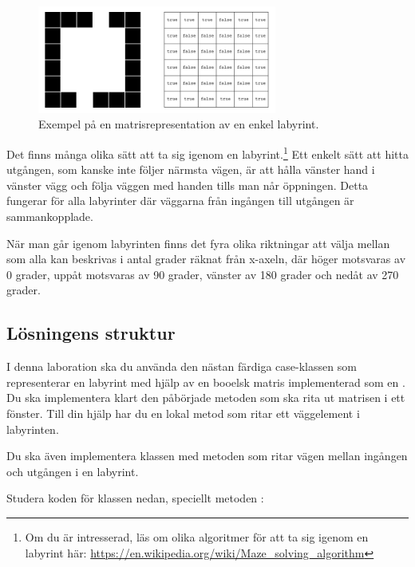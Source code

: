 \begin{figure}[h]
	\begin{center}
		\includegraphics[width=0.7\textwidth]{../img/w09-lab/MazeAndMatrix.jpg}
	\end{center}
	\caption{Exempel på en matrisrepresentation av en enkel labyrint.}
	\label{maze:figboolmatrix}
\end{figure}

Det finns många olika sätt att ta sig igenom en labyrint.\footnote{Om du är intresserad, läs om olika algoritmer för att ta sig igenom en labyrint här: \url{https://en.wikipedia.org/wiki/Maze\_solving\_algorithm}} Ett enkelt sätt att hitta utgången, som kanske inte följer närmsta vägen, är att hålla vänster hand i vänster vägg och följa väggen med handen tills man når öppningen. Detta fungerar för alla labyrinter där väggarna från ingången till utgången är sammankopplade.

När man går igenom labyrinten finns det fyra olika riktningar att välja mellan som alla kan beskrivas i antal grader räknat från x-axeln, där höger motsvaras av 0 grader, uppåt motsvaras av 90 grader, vänster av 180 grader och nedåt av 270 grader.

\subsection{Lösningens struktur}

I denna laboration ska du använda den nästan färdiga case-klassen  som representerar en labyrint med hjälp av en booelsk matris implementerad som en .
Du ska implementera klart den påbörjade metoden  som ska rita ut matrisen i ett fönster. Till din hjälp har du en lokal metod som ritar ett väggelement i labyrinten.

Du ska även implementera klassen  med metoden  som ritar vägen mellan ingången och utgången i en labyrint.

Studera koden för klassen  nedan, speciellt metoden :

